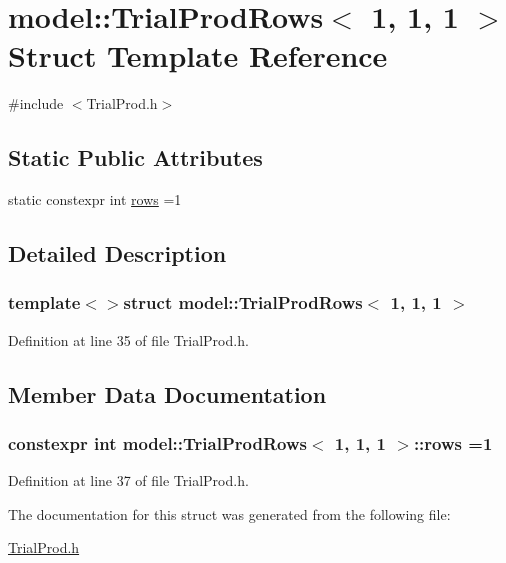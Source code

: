 \hypertarget{structmodel_1_1_trial_prod_rows_3_011_00_011_00_011_01_4}{}\section{model\+:\+:Trial\+Prod\+Rows$<$ 1, 1, 1 $>$ Struct Template Reference}
\label{structmodel_1_1_trial_prod_rows_3_011_00_011_00_011_01_4}


{\ttfamily \#include $<$Trial\+Prod.\+h$>$}

\subsection*{Static Public Attributes}
\begin{DoxyCompactItemize}
\item 
static constexpr int \hyperlink{structmodel_1_1_trial_prod_rows_3_011_00_011_00_011_01_4_ae7fc51f3f5fbb705ff80598c752ec9c0}{rows} =1
\end{DoxyCompactItemize}


\subsection{Detailed Description}
\subsubsection*{template$<$$>$struct model\+::\+Trial\+Prod\+Rows$<$ 1, 1, 1 $>$}



Definition at line 35 of file Trial\+Prod.\+h.



\subsection{Member Data Documentation}
\hypertarget{structmodel_1_1_trial_prod_rows_3_011_00_011_00_011_01_4_ae7fc51f3f5fbb705ff80598c752ec9c0}{}
\subsubsection[{rows}]{\setlength{\rightskip}{0pt plus 5cm}constexpr int {\bf model\+::\+Trial\+Prod\+Rows}$<$ 1, 1, 1 $>$\+::rows =1\hspace{0.3cm}{\ttfamily [static]}}\label{structmodel_1_1_trial_prod_rows_3_011_00_011_00_011_01_4_ae7fc51f3f5fbb705ff80598c752ec9c0}


Definition at line 37 of file Trial\+Prod.\+h.



The documentation for this struct was generated from the following file\+:\begin{DoxyCompactItemize}
\item 
\hyperlink{_trial_prod_8h}{Trial\+Prod.\+h}\end{DoxyCompactItemize}
